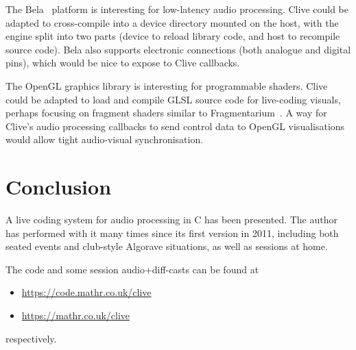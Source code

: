 \documentclass[11pt,a4paper]{article}
\begin{document}
The Bela~\cite{BELA} platform is interesting for low-latency audio processing.
Clive could be adapted to cross-compile into a device directory mounted on
the host, with the engine split into two parts (device to reload library
code, and host to recompile source code).  Bela also supports electronic
connections (both analogue and digital pins), which would be nice to expose
to Clive callbacks.

The OpenGL graphics library is interesting for programmable shaders.  Clive
could be adapted to load and compile GLSL source code for live-coding visuals,
perhaps focusing on fragment shaders similar to Fragmentarium~\cite{FRAG}.
A way for Clive's audio processing callbacks to send control data to OpenGL
visualisations would allow tight audio-visual synchronisation.


\section{Conclusion}\label{conclusion}

A live coding system for audio processing in C has been presented. The
author has performed with it many times since its first version in 2011,
including both seated events and club-style Algorave situations, as well
as sessions at home.

The code and some session audio+diff-casts can be found at
\begin{itemize}
\item \url{https://code.mathr.co.uk/clive}
\item \url{https://mathr.co.uk/clive}
\end{itemize}
respectively.



\end{document}
